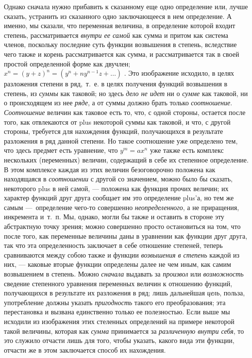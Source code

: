 Однако сначала нужно прибавить к сказанному еще одно определение или, лучше
сказать, устранить из сказанного одно заключающееся в нем определение. А
именно, мы сказали, что переменная величина, в определение которой входит
степень, рассматривается {\em внутри ее самой} как
сумма и притом как система членов, поскольку последние суть функции
возвышения в степень, вследствие чего также и корень рассматривается как
сумма, и рассматривается так в своей простой определенной форме как
двучлен;  $x^n = (y + z)^n = (y^n + \mathit{ny}^{n-1}z + {\dots})$ . Это изображение
исходило, в целях разложения степени в ряд,~т.~е. в целях получения функций
возвышения в степень, из {\em суммы} как таковой; но
здесь {\em дело не идет} ни о
{\em сумме} как таковой, ни о происходящем из нее
{\em ряде}, а от суммы должно брать только
{\em соотношение}.
{\em Соотношение} величин как таковое есть то, что, с
одной стороны, остается после того, как отвлекаются от plus некоторой суммы
как таковой, и что, с другой стороны, требуется для нахождения функций,
получающихся в результате разложения в ряд данной степени. Но такое
соотношение уже определено тем, что здесь предмет есть уравнение, что 
$y^m = ax^n$  уже также есть комплекс нескольких (переменных) величин,
содержащий в себе их степенное определение. В этом комплексе каждая из этих
величин безоговорочно положена как находящаяся в
{\em соотношении} с другой со значением, можно было бы
сказать, некоторого plus в ней самой, — положена как функция прочих
величин; их характер функций друг друга сообщает им это определение plus'а,
но тем же самым —~определение чего-то совершенно
{\em неопределенного}, а не приращения, инкремента
и~т.~п. Мы, однако, могли бы также и оставить в стороне эту абстрактную
точку зрения; можно совершенно просто остановиться на том, что после того,
как переменные величины даны в уравнении как функции друг друга, так что
эта определенность заключает в себе отношение степеней, теперь сравниваются
между собою также и функции {\em возвышения в степень}
каждой из них, — каковые вторые функции определены далее не чем иным, как
самим возвышением в степень. Можно {\em сначала}
выдавать за {\em произвол} или
{\em возможность} сведение степенного уравнения
переменных величин к отношению функций, получающихся в результате их
разложения в ряд; лишь дальнейшая {\em цель}, польза,
употребление должны указать {\em пригодность} такого
его преобразования; эта перестановка и вызвана единственно только ее
полезностью. Если выше мы исходили из изображения этих стеленных
определений на примере некоторой такой величины, которая как
{\em сумма} принимается за
{\em различенную внутри себя}, то это служило отчасти
лишь для того, чтобы указать, какого вида эти функции, отчасти же в этом
заключается способ их нахождения.

